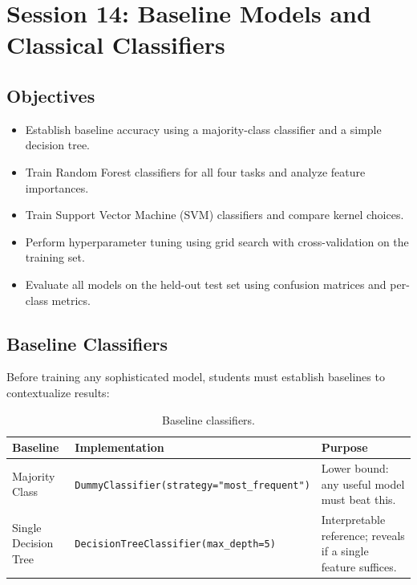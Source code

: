 \documentclass[11pt,letterpaper]{article}
\begin{document}
	\newpage
	\section{Session 14: Baseline Models and Classical Classifiers}
	\label{sec:classical}

	\subsection{Objectives}

	\begin{itemize}[leftmargin=2em]
		\item Establish baseline accuracy using a majority-class classifier and a simple decision tree.
		\item Train Random Forest classifiers for all four tasks and analyze feature importances.
		\item Train Support Vector Machine (SVM) classifiers and compare kernel choices.
		\item Perform hyperparameter tuning using grid search with cross-validation on the training set.
		\item Evaluate all models on the held-out test set using confusion matrices and per-class metrics.
	\end{itemize}

	\subsection{Baseline Classifiers}

	Before training any sophisticated model, students must establish baselines to contextualize results:

	\begin{table}[ht!]
		\centering
		\caption{Baseline classifiers.}
		\label{tab:baselines}
		\renewcommand{\arraystretch}{1.3}
		\begin{tabularx}{\textwidth}{l l X}
			\toprule
			\textbf{Baseline} & \textbf{Implementation} & \textbf{Purpose} \\
			\midrule
			Majority Class & \texttt{DummyClassifier(strategy="most\_frequent")} & Lower bound: any useful model must beat this. \\
			Single Decision Tree & \texttt{DecisionTreeClassifier(max\_depth=5)} & Interpretable reference; reveals if a single feature suffices. \\
			\bottomrule
		\end{tabularx}
	\end{table}
\end{document}
